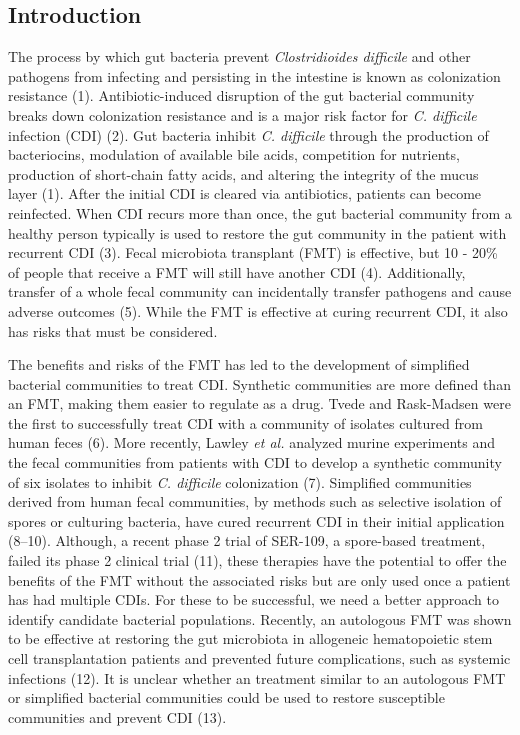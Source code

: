 \documentclass[
  12pt,
]{article}
\begin{document}
\newpage

\hypertarget{introduction}{%
\subsection{Introduction}\label{introduction}}

The process by which gut bacteria prevent \emph{Clostridioides
difficile} and other pathogens from infecting and persisting in the
intestine is known as colonization resistance (1). Antibiotic-induced
disruption of the gut bacterial community breaks down colonization
resistance and is a major risk factor for \emph{C. difficile} infection
(CDI) (2). Gut bacteria inhibit \emph{C. difficile} through the
production of bacteriocins, modulation of available bile acids,
competition for nutrients, production of short-chain fatty acids, and
altering the integrity of the mucus layer (1). After the initial CDI is
cleared via antibiotics, patients can become reinfected. When CDI recurs
more than once, the gut bacterial community from a healthy person
typically is used to restore the gut community in the patient with
recurrent CDI (3). Fecal microbiota transplant (FMT) is effective, but
10 - 20\% of people that receive a FMT will still have another CDI (4).
Additionally, transfer of a whole fecal community can incidentally
transfer pathogens and cause adverse outcomes (5). While the FMT is
effective at curing recurrent CDI, it also has risks that must be
considered.

The benefits and risks of the FMT has led to the development of
simplified bacterial communities to treat CDI. Synthetic communities are
more defined than an FMT, making them easier to regulate as a drug.
Tvede and Rask-Madsen were the first to successfully treat CDI with a
community of isolates cultured from human feces (6). More recently,
Lawley \emph{et al.} analyzed murine experiments and the fecal
communities from patients with CDI to develop a synthetic community of
six isolates to inhibit \emph{C. difficile} colonization (7). Simplified
communities derived from human fecal communities, by methods such as
selective isolation of spores or culturing bacteria, have cured
recurrent CDI in their initial application (8--10). Although, a recent
phase 2 trial of SER-109, a spore-based treatment, failed its phase 2
clinical trial (11), these therapies have the potential to offer the
benefits of the FMT without the associated risks but are only used once
a patient has had multiple CDIs. For these to be successful, we need a
better approach to identify candidate bacterial populations. Recently,
an autologous FMT was shown to be effective at restoring the gut
microbiota in allogeneic hematopoietic stem cell transplantation
patients and prevented future complications, such as systemic infections
(12). It is unclear whether an treatment similar to an autologous FMT or
simplified bacterial communities could be used to restore susceptible
communities and prevent CDI (13).
\end{document}
